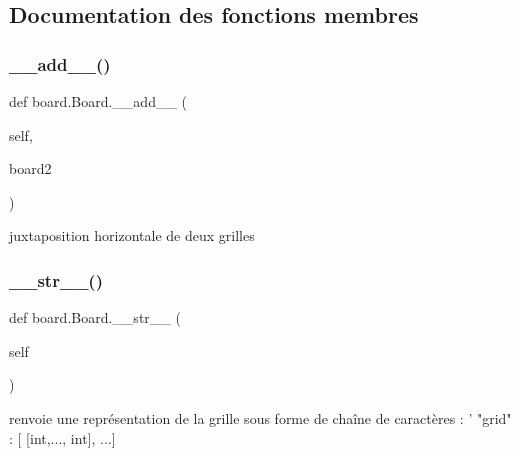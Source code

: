 \subsection{Documentation des fonctions membres}
\mbox{\label{classboard_1_1Board_abd162106bb4e4227679ed4ae5176f487}} 
\subsubsection{\texorpdfstring{\+\_\+\+\_\+add\+\_\+\+\_\+()}{\_\_add\_\_()}}
{\footnotesize\ttfamily def board.\+Board.\+\_\+\+\_\+add\+\_\+\+\_\+ (\begin{DoxyParamCaption}\item[{}]{self,  }\item[{}]{board2 }\end{DoxyParamCaption})}

\begin{DoxyVerb}juxtaposition horizontale de deux grilles \end{DoxyVerb}
 \mbox{\label{classboard_1_1Board_a250139b957b679637dcdd946e752f8c3}} 
\subsubsection{\texorpdfstring{\+\_\+\+\_\+str\+\_\+\+\_\+()}{\_\_str\_\_()}}
{\footnotesize\ttfamily def board.\+Board.\+\_\+\+\_\+str\+\_\+\+\_\+ (\begin{DoxyParamCaption}\item[{}]{self }\end{DoxyParamCaption})}

\begin{DoxyVerb}renvoie une représentation de la grille sous forme de chaîne de caractères :
' "grid" : [ [int,..., int], ...]
\end{DoxyVerb}
 \mbox{\label{classboard_1_1Board_ab70bf2990045428534f01b124a50c013}} 
